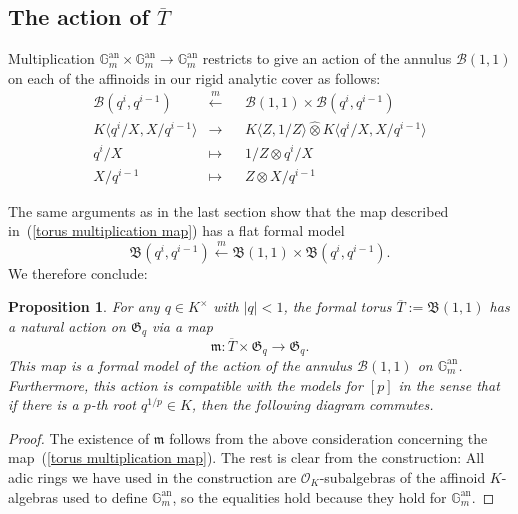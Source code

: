 \documentclass[10pt,oneside]{amsart}
\newtheorem{proposition}[theorem]{Proposition}
\theoremstyle{definition}
\begin{document}
	\subsection{The action of $\overline{T}$}
	Multiplication $\mathbb G_m^{\operatorname{an}}\times \mathbb G_m^{\operatorname{an}}\rightarrow \mathbb G_m^{\operatorname{an}}$ restricts to give an action of the annulus $\mathcal B(1,1)$ on each of the affinoids in our rigid analytic cover as follows: 
	\begin{equation}
	\begin{alignedat}{2} \label{torus multiplication map}
	\mathcal B(q^i,q^{i-1}) &\xleftarrow{m}&& \mathcal B(1,1)\times \mathcal B(q^i,q^{i-1})\\
	K\langle  q^i/X, X/q^{i-1} \rangle&\rightarrow &&K\langle Z, 1/Z\rangle\widehat{\otimes} K\langle  q^i/X, X/q^{i-1}\rangle\\
	q^i/X &\mapsto&& 1/Z\otimes q^i/X\\
	X/q^{i-1} &\mapsto&& Z\otimes X/q^{i-1}
	\end{alignedat}
	\end{equation}

	
	The same arguments as in the last section show that the map described in~(\ref{torus multiplication map}) has a flat formal model
	\[\mathfrak B(q^i,q^{i-1}) \xleftarrow{m} \mathfrak B(1,1)\times \mathfrak B(q^i,q^{i-1}).\] We therefore conclude:
	
	\begin{proposition}\label{action on formal model of torus}
		For any $q\in K^\times$ with $|q|<1$, the formal torus $\overline{T}:=\mathfrak B(1,1)$ has a natural action on $\mathfrak G_q$ via a map
		\[\mathfrak m:\overline{T}\times \mathfrak G_q\rightarrow \mathfrak G_q.\]
		This map is a formal model of the action of the annulus $\mathcal B(1,1)$ on $\mathbb G_m^{\operatorname{an}}$. Furthermore, this action is compatible with the models for $[p]$ in the sense that if there is a $p$-th root $q^{1/p}\in K$, then the following diagram commutes.
		\begin{center}
		\end{center}
	\end{proposition} 
	\begin{proof}
		The existence of $\mathfrak m$ follows from the above consideration concerning the map~(\ref{torus multiplication map}). The rest is clear from the construction: All adic rings we have used in the construction are $\mathcal O_K$-subalgebras of the affinoid $K$-algebras used to define $\mathbb G_m^{\operatorname{an}}$, so the equalities hold because they hold for $\mathbb G_m^{\operatorname{an}}$.
	\end{proof}
	
\end{document}
